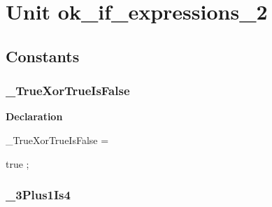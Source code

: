 \documentclass{report}
\newif\ifpdf
\begin{document}
\label{toc}\tableofcontents
\newpage
\newlength{\tmplength}
\chapter{Unit ok{\_}if{\_}expressions{\_}2}
\label{ok_if_expressions_2}
\section{Constants}
\ifpdf
\subsection*{\large{\textbf{{\_}TrueXorTrueIsFalse}}\normalsize\hspace{1ex}\hrulefill}
\else
\subsection*{{\_}TrueXorTrueIsFalse}
\fi
\label{ok_if_expressions_2-_TrueXorTrueIsFalse}
\begin{list}{}{
\setlength{\itemindent}{0cm}
\setlength{\listparindent}{0cm}
\setlength{\leftmargin}{\evensidemargin}
\addtolength{\leftmargin}{\tmplength}
\settowidth{\labelsep}{X}
\addtolength{\leftmargin}{\labelsep}
\setlength{\labelwidth}{\tmplength}
}
\item[\textbf{Declaration}\hfill]
\ifpdf
\begin{flushleft}
\fi
\begin{ttfamily}
{\_}TrueXorTrueIsFalse =

true
;\end{ttfamily}

\ifpdf
\end{flushleft}
\fi

\end{list}
\ifpdf
\subsection*{\large{\textbf{{\_}3Plus1Is4}}\normalsize\hspace{1ex}\hrulefill}
\else
\end{document}
